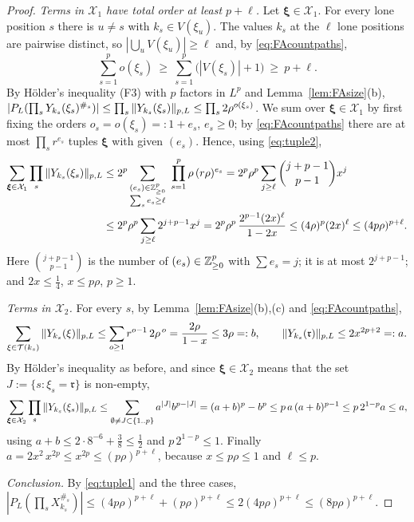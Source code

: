 \begin{proof}
\emph{Terms in $\mathcal X_1$ have total order at least $p+\ell$.} Let $\boldsymbol\xi\in\mathcal X_1$. For every lone position $s$ there is $u\ne s$ with $k_s\in V(\xi_u)$. The values $k_s$ at the $\ell$ lone positions are pairwise distinct, so $|\bigcup_uV(\xi_u)|\ge\ell$ and, by \eqref{eq:FAcountpaths},
\begin{equation}\label{eq:tuple2}
 \sum_{s=1}^po(\xi_s)\ \ge\ \sum_{s=1}^p\big(|V(\xi_s)|+1\big)\ \ge\ p+\ell .
\end{equation}
By H\"older's inequality (F3) with $p$ factors in $L^p$ and Lemma~\ref{lem:FAsize}(b), $|P_L(\prod_sY_{k_s}(\xi_s)^{\#_s})|\le\prod_s\|Y_{k_s}(\xi_s)\|_{p,L}\le\prod_s2\rho^{o(\xi_s)}$. We sum over $\boldsymbol\xi\in\mathcal X_1$ by first fixing the orders $o_s=o(\xi_s)=:1+e_s$, $e_s\ge0$;
by \eqref{eq:FAcountpaths} there are at most $\prod_sr^{e_s}$ tuples $\boldsymbol\xi$ with given $(e_s)$. Hence, using \eqref{eq:tuple2},
\begin{align}
 \sum_{\boldsymbol\xi\in\mathcal X_1}\prod_{s}\norm{Y_{k_s}(\xi_s)}_{p,L}&\le2^p\sum_{\substack{(e_s)\in\Z_{\ge0}^p\\ \sum_se_s\ge\ell}}\ \prod_{s=1}^p\rho\,(r\rho)^{e_s}=2^p\rho^p\sum_{j\ge\ell}\binom{j+p-1}{p-1}x^j\nonumber\\
 &\le2^p\rho^p\sum_{j\ge\ell}2^{j+p-1}x^j=2^p\rho^p\,\frac{2^{p-1}(2x)^\ell}{1-2x}\le(4\rho)^p(2x)^\ell\le(4p\rho)^{p+\ell}.\label{eq:tuple3}
\end{align}
Here $\binom{j+p-1}{p-1}$ is the number of $(e_s)\in\mathbb{Z}_{\ge0}^p$ with $\sum e_s=j$; it is at most $2^{j+p-1}$; and $2x\le\frac14$, $x\le p\rho$, $p\ge1$.

\emph{Terms in $\mathcal X_2$.} For every $s$, by Lemma~\ref{lem:FAsize}(b),(c) and \eqref{eq:FAcountpaths},
\[
 \sum_{\xi\in\mathcal T(k_s)}\|Y_{k_s}(\xi)\|_{p,L}\le\sum_{o\ge1}r^{o-1}\,2\rho^{\,o}=\frac{2\rho}{1-x}\le3\rho=:b,\qquad\|Y_{k_s}(\mathfrak r)\|_{p,L}\le2x^{2p+2}=:a .
\]
By H\"older's inequality as before, and since $\boldsymbol\xi\in\mathcal X_2$ means that the set $J:=\{s:\xi_s=\mathfrak r\}$ is non-empty,
\[
 \sum_{\boldsymbol\xi\in\mathcal X_2}\prod_s\|Y_{k_s}(\xi_s)\|_{p,L}\le\sum_{\emptyset\ne J\subset\{1..p\}}a^{|J|}b^{p-|J|}=(a+b)^p-b^p\le p\,a\,(a+b)^{p-1}\le p\,2^{1-p}a\le a,
\]
using $a+b\le2\cdot8^{-6}+\frac38\le\frac12$ and $p\,2^{1-p}\le1$. Finally $a=2x^2\,x^{2p}\le x^{2p}\le(p\rho)^{p+\ell}$, because $x\le p\rho\le1$ and $\ell\le p$.

\emph{Conclusion.} By \eqref{eq:tuple1} and the three cases, $|P_L(\prod_sX_{k_s}^{\#_s})|\le(4p\rho)^{p+\ell}+(p\rho)^{p+\ell}\le2(4p\rho)^{p+\ell}\le(8p\rho)^{p+\ell}$.
\end{proof}

